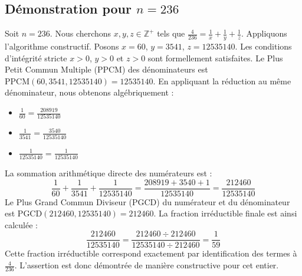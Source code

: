 \documentclass[11pt,a4paper]{article}
\begin{document}
\subsection{Démonstration pour $n = 236$}
Soit $n = 236$. Nous cherchons $x, y, z \in \mathbb{Z}^{+}$ tels que $\frac{4}{236} = \frac{1}{x} + \frac{1}{y} + \frac{1}{z}$.
Appliquons l'algorithme constructif. Posons $x = 60$, $y = 3541$, $z = 12535140$.
Les conditions d'intégrité stricte $x > 0$, $y > 0$ et $z > 0$ sont formellement satisfaites.
Le Plus Petit Commun Multiple (PPCM) des dénominateurs est $\text{PPCM}(60, 3541, 12535140) = 12535140$.
En appliquant la réduction au même dénominateur, nous obtenons algébriquement :
\begin{itemize}
    \item $\frac{1}{60} = \frac{208919}{12535140}$
    \item $\frac{1}{3541} = \frac{3540}{12535140}$
    \item $\frac{1}{12535140} = \frac{1}{12535140}$
\end{itemize}
La sommation arithmétique directe des numérateurs est :
$$ \frac{1}{60} + \frac{1}{3541} + \frac{1}{12535140} = \frac{208919 + 3540 + 1}{12535140} = \frac{212460}{12535140} $$
Le Plus Grand Commun Diviseur (PGCD) du numérateur et du dénominateur est $\text{PGCD}(212460, 12535140) = 212460$.
La fraction irréductible finale est ainsi calculée :
$$ \frac{212460}{12535140} = \frac{212460 \div 212460}{12535140 \div 212460} = \frac{1}{59} $$
Cette fraction irréductible correspond exactement par identification des termes à $\frac{4}{236}$. L'assertion est donc démontrée de manière constructive pour cet entier.
\end{document}
